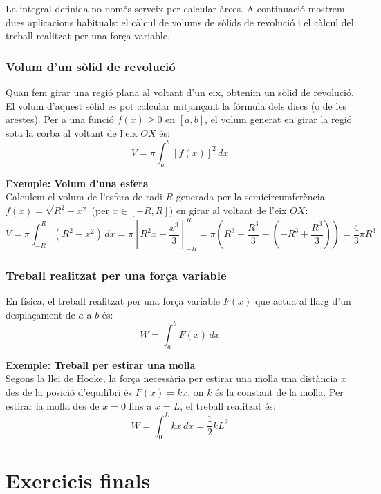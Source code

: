 \documentclass[12pt]{article}
\begin{document}
La integral definida no només serveix per calcular àrees. A continuació mostrem dues aplicacions habituals: el càlcul de volums de sòlids de revolució i el càlcul del treball realitzat per una força variable.

\subsubsection*{Volum d'un sòlid de revolució}

Quan fem girar una regió plana al voltant d'un eix, obtenim un sòlid de revolució. El volum d'aquest sòlid es pot calcular mitjançant la fórmula dels discs (o de les arestes). Per a una funció $f(x) \ge 0$ en $[a,b]$, el volum generat en girar la regió sota la corba al voltant de l'eix $OX$ és:
\[
\boxed{V = \pi \int_a^b [f(x)]^2\,dx}
\]

\begin{exemple}
\textbf{Exemple: Volum d'una esfera}\\
Calculem el volum de l'esfera de radi $R$ generada per la semicircumferència $f(x) = \sqrt{R^2 - x^2}$ (per $x \in [-R,R]$) en girar al voltant de l'eix $OX$:
\[
V = \pi \int_{-R}^{R} (R^2 - x^2)\,dx = \pi \left[ R^2 x - \frac{x^3}{3} \right]_{-R}^{R} = \pi \left( R^3 - \frac{R^3}{3} - \left(-R^3 + \frac{R^3}{3}\right) \right) = \frac{4}{3}\pi R^3
\]
\end{exemple}

\subsubsection*{Treball realitzat per una força variable}

En física, el treball realitzat per una força variable $F(x)$ que actua al llarg d'un desplaçament de $a$ a $b$ és:
\[
\boxed{W = \int_a^b F(x)\,dx}
\]

\begin{exemple}
\textbf{Exemple: Treball per estirar una molla}\\
Segons la llei de Hooke, la força necessària per estirar una molla una distància $x$ des de la posició d'equilibri és $F(x) = kx$, on $k$ és la constant de la molla. Per estirar la molla des de $x=0$ fins a $x=L$, el treball realitzat és:
\[
W = \int_0^L kx\,dx = \frac{1}{2}kL^2
\]
\end{exemple}


\section{Exercicis finals}
\end{document}
